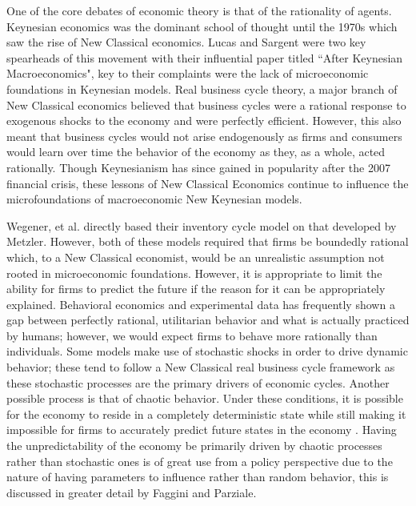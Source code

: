One of the core debates of economic theory is that of the rationality of agents. Keynesian economics was the dominant school of thought until the 1970s which saw the rise of New Classical economics\autocite{Hartley2013}. Lucas and Sargent were two key spearheads of this movement with their influential paper titled ``After Keynesian Macroeconomics", key to their complaints were the lack of microeconomic foundations in Keynesian models\autocite{Lucas1979}. Real business cycle theory, a major branch of New Classical economics believed that business cycles were a rational response to exogenous shocks to the economy and were perfectly efficient. However, this also meant that business cycles would not arise endogenously as firms and consumers would learn over time the behavior of the economy as they, as a whole, acted rationally. Though Keynesianism has since gained in popularity after the 2007 financial crisis, these lessons of New Classical Economics continue to influence the microfoundations of macroeconomic New Keynesian models.

Wegener, et al. directly based their inventory cycle model on that developed by Metzler. However, both of these models required that firms be boundedly rational which, to a New Classical economist, would be an unrealistic assumption not rooted in microeconomic foundations. However, it is appropriate to limit the ability for firms to predict the future if the reason for it can be appropriately explained. Behavioral economics and experimental data has frequently shown a gap between perfectly rational, utilitarian behavior and what is actually practiced by humans\autocite{Smith1988}; however, we would expect firms to behave more rationally than individuals. Some models make use of stochastic shocks in order to drive dynamic behavior; these tend to follow a New Classical real business cycle framework as these stochastic processes are the primary drivers of economic cycles. Another possible process is that of chaotic behavior. Under these conditions, it is possible for the economy to reside in a completely deterministic state while still making it impossible for firms to accurately predict future states in the economy . Having the unpredictability of the economy be primarily driven by chaotic processes rather than stochastic ones is of great use from a policy perspective due to the nature of having parameters to influence rather than random behavior, this is discussed in greater detail by Faggini and Parziale\autocite{Faggini2012}. 

